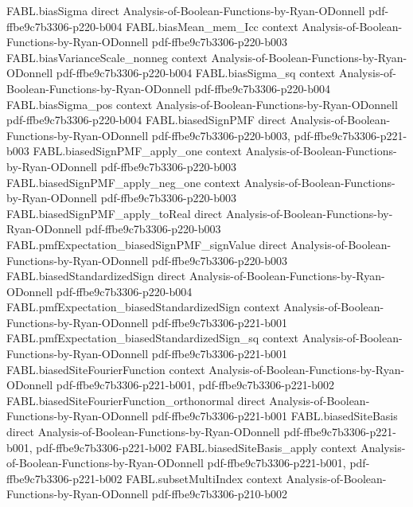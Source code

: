 \begin{theorem}
\proofstep
  {FABL.biasSigma}
  {direct}
  {Analysis-of-Boolean-Functions-by-Ryan-ODonnell}
  {pdf-ffbe9c7b3306-p220-b004}
\proofstep
  {FABL.biasMean_mem_Icc}
  {context}
  {Analysis-of-Boolean-Functions-by-Ryan-ODonnell}
  {pdf-ffbe9c7b3306-p220-b003}
\proofstep
  {FABL.biasVarianceScale_nonneg}
  {context}
  {Analysis-of-Boolean-Functions-by-Ryan-ODonnell}
  {pdf-ffbe9c7b3306-p220-b004}
\proofstep
  {FABL.biasSigma_sq}
  {context}
  {Analysis-of-Boolean-Functions-by-Ryan-ODonnell}
  {pdf-ffbe9c7b3306-p220-b004}
\proofstep
  {FABL.biasSigma_pos}
  {context}
  {Analysis-of-Boolean-Functions-by-Ryan-ODonnell}
  {pdf-ffbe9c7b3306-p220-b004}
\proofstep
  {FABL.biasedSignPMF}
  {direct}
  {Analysis-of-Boolean-Functions-by-Ryan-ODonnell}
  {pdf-ffbe9c7b3306-p220-b003,
    pdf-ffbe9c7b3306-p221-b003}
\proofstep
  {FABL.biasedSignPMF_apply_one}
  {context}
  {Analysis-of-Boolean-Functions-by-Ryan-ODonnell}
  {pdf-ffbe9c7b3306-p220-b003}
\proofstep
  {FABL.biasedSignPMF_apply_neg_one}
  {context}
  {Analysis-of-Boolean-Functions-by-Ryan-ODonnell}
  {pdf-ffbe9c7b3306-p220-b003}
\proofstep
  {FABL.biasedSignPMF_apply_toReal}
  {direct}
  {Analysis-of-Boolean-Functions-by-Ryan-ODonnell}
  {pdf-ffbe9c7b3306-p220-b003}
\proofstep
  {FABL.pmfExpectation_biasedSignPMF_signValue}
  {direct}
  {Analysis-of-Boolean-Functions-by-Ryan-ODonnell}
  {pdf-ffbe9c7b3306-p220-b003}
\proofstep
  {FABL.biasedStandardizedSign}
  {direct}
  {Analysis-of-Boolean-Functions-by-Ryan-ODonnell}
  {pdf-ffbe9c7b3306-p220-b004}
\proofstep
  {FABL.pmfExpectation_biasedStandardizedSign}
  {context}
  {Analysis-of-Boolean-Functions-by-Ryan-ODonnell}
  {pdf-ffbe9c7b3306-p221-b001}
\proofstep
  {FABL.pmfExpectation_biasedStandardizedSign_sq}
  {context}
  {Analysis-of-Boolean-Functions-by-Ryan-ODonnell}
  {pdf-ffbe9c7b3306-p221-b001}
\proofstep
  {FABL.biasedSiteFourierFunction}
  {context}
  {Analysis-of-Boolean-Functions-by-Ryan-ODonnell}
  {pdf-ffbe9c7b3306-p221-b001,
    pdf-ffbe9c7b3306-p221-b002}
\proofstep
  {FABL.biasedSiteFourierFunction_orthonormal}
  {direct}
  {Analysis-of-Boolean-Functions-by-Ryan-ODonnell}
  {pdf-ffbe9c7b3306-p221-b001}
\proofstep
  {FABL.biasedSiteBasis}
  {direct}
  {Analysis-of-Boolean-Functions-by-Ryan-ODonnell}
  {pdf-ffbe9c7b3306-p221-b001,
    pdf-ffbe9c7b3306-p221-b002}
\proofstep
  {FABL.biasedSiteBasis_apply}
  {context}
  {Analysis-of-Boolean-Functions-by-Ryan-ODonnell}
  {pdf-ffbe9c7b3306-p221-b001,
    pdf-ffbe9c7b3306-p221-b002}
\proofstep
  {FABL.subsetMultiIndex}
  {context}
  {Analysis-of-Boolean-Functions-by-Ryan-ODonnell}
  {pdf-ffbe9c7b3306-p210-b002}

\end{theorem}
